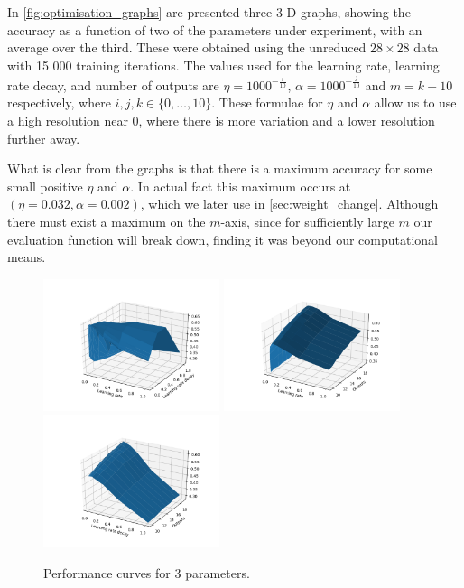 \documentclass[a4paper, 11pt, twocolumn, final]{article} %
\begin{document}
In \autoref{fig:optimisation_graphs} are presented three 3-D graphs, showing the
accuracy as a function of two of the parameters under experiment, with an
average over the third.  These were obtained using the unreduced $28 \times 28$
data with 15 000 training iterations.  The values used for the learning rate,
learning rate decay, and number of outputs are $\eta = 1000^{-\frac{i}{10}}$,
$\alpha = 1000^{-\frac{j}{10}}$ and $m = k + 10$ respectively, where $i, j, k
\in \{0, \ldots, 10\}$.  These formulae for $\eta$ and $\alpha$ allow us to use
a high resolution near 0, where there is more variation and a lower resolution
further away.

What is clear from the graphs is that there is a maximum accuracy for some small
positive $\eta$ and $\alpha$.  In actual fact this maximum occurs at $(\eta =
0.032, \alpha = 0.002)$, which we later use in \autoref{sec:weight_change}.
Although there must exist a maximum on the $m$-axis, since for sufficiently
large $m$ our evaluation function will break down, finding it was beyond our
computational means.

\begin{figure}
  \includegraphics[width=0.46\textwidth]{optimisation/01.png}
  \includegraphics[width=0.46\textwidth]{optimisation/02.png}
  \includegraphics[width=0.46\textwidth]{optimisation/12.png}
  \caption{Performance curves for 3 parameters.}
  \label{fig:optimisation_graphs}
\end{figure}
\end{document}
